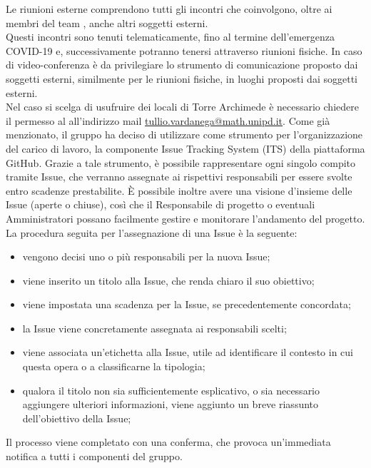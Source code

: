 				Le riunioni esterne comprendono tutti gli incontri che coinvolgono, oltre ai membri del team \Gruppo{}, anche altri soggetti esterni.\\
				Questi incontri sono tenuti telematicamente, fino al termine dell'emergenza COVID-19 e, successivamente potranno tenersi attraverso riunioni fisiche. In caso di video-conferenza è da privilegiare lo strumento di comunicazione proposto dai soggetti esterni, similmente per le riunioni fisiche, in luoghi proposti dai soggetti esterni.\\
				Nel caso si scelga di usufruire dei locali di Torre Archimede è necessario chiedere il permesso al \TV{} all'indirizzo mail \href{mailto:tullio.vardanega@math.unipd.it}{tullio.vardanega@math.unipd.it}.	
			Come già menzionato, il gruppo ha deciso di utilizzare come strumento per l'organizzazione del carico di lavoro, la componente Issue Tracking System (ITS) della piattaforma GitHub. Grazie a tale strumento, è possibile rappresentare ogni singolo compito tramite Issue, che verranno assegnate ai rispettivi responsabili per essere svolte entro scadenze prestabilite. È possibile inoltre avere una visione d'insieme delle Issue (aperte o chiuse), così che il Responsabile di progetto o eventuali Amministratori possano facilmente gestire e monitorare l'andamento del progetto.
			La procedura seguita per l'assegnazione di una Issue è la seguente:
			\begin{itemize}
				\item vengono decisi uno o più responsabili per la nuova Issue;
				\item viene inserito un titolo alla Issue, che renda chiaro il suo obiettivo;
				\item viene impostata una scadenza per la Issue, se precedentemente concordata;
				\item la Issue viene concretamente assegnata ai responsabili scelti;
				\item viene associata un'etichetta alla Issue, utile ad identificare il contesto in cui questa opera o a classificarne la tipologia;
				\item qualora il titolo non sia sufficientemente esplicativo, o sia necessario aggiungere ulteriori informazioni, viene aggiunto un breve riassunto dell'obiettivo della Issue;		
			\end{itemize}
			Il processo viene completato con una conferma, che provoca un'immediata notifica a tutti i componenti del gruppo.
				
